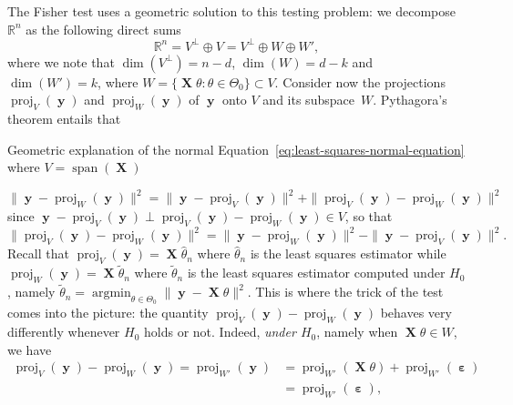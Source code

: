 \documentclass[
	fontsize=11pt, %
	twoside=false, %
	numbers=noenddot, %
]{kaobook}
\DeclareMathOperator{\bX}{{\boldsymbol X}}
\DeclareMathOperator{\by}{{\boldsymbol y}}
\DeclareMathOperator{\beps}{\boldsymbol \varepsilon}
\DeclareMathOperator*{\argmin}{argmin}
\DeclareMathOperator*{\spa}{span}
\DeclareMathOperator{\proj}{proj}
\newcommand{\R}{\mathbb R}
\newcommand{\wh}{\widehat}
\newcommand{\wt}{\widetilde}
\newcommand{\norm}[1]{\| #1 \|}
\begin{document}
The Fisher test uses a geometric solution to this testing problem: we decompose $\R^n$ as the following direct sums
\begin{equation*}
	\R^n = V^\perp \oplus V = V^\perp \oplus W \oplus W',
\end{equation*}
where we note that $\dim(V^\perp) = n - d$, $\dim(W) = d - k$ and $\dim(W') = k$, where $W = \{ \bX \theta : \theta \in \Theta_0 \} \subset V$.
Consider now the projections $\proj_V(\by)$ and $\proj_W(\by)$ of $\by$ onto $V$ and its subspace~$W$.
Pythagora's theorem entails that%
\begin{marginfigure}%
%
\caption{Geometric explanation of the normal Equation~\eqref{eq:least-squares-normal-equation} where $V = \spa(\bX)$}
\end{marginfigure}%
\begin{equation*}
	\norm{\by - \proj_W(\by)}^2 = \norm{\by - \proj_V(\by)}^2 + \norm{\proj_V(\by) - \proj_W(\by)}^2
\end{equation*}
since $\by - \proj_V(\by) \perp \proj_V(\by) - \proj_W(\by) \in V$, so that 
\begin{equation*}
	\norm{\proj_V(\by) - \proj_W(\by)}^2 = \norm{\by - \proj_W(\by)}^2 - \norm{\by - \proj_V(\by)}^2.
\end{equation*}
Recall that $\proj_V(\by) = \bX \wh \theta_n$ where $\wh \theta_n$ is the least squares estimator while $\proj_W(\by) = \bX \wt \theta_n$ where $\wt \theta_n$ is the least squares estimator computed under $H_0$, namely $\wt \theta_n = \argmin_{\theta \in \Theta_0} \norm{\by - \bX \theta}^2$.
This is where the trick of the test comes into the picture: the quantity $\proj_V(\by) - \proj_W(\by)$ behaves very differently whenever $H_0$ holds or not. 
Indeed, \emph{under $H_0$}, namely when $\bX \theta \in W$, we have
\begin{align*}
	\proj_V(\by) - \proj_W(\by) = \proj_{W'} (\by) &= \proj_{W'}(\bX \theta) + \proj_{W'}(\beps) \\
	&= \proj_{W'}(\beps),
\end{align*}
\end{document}
